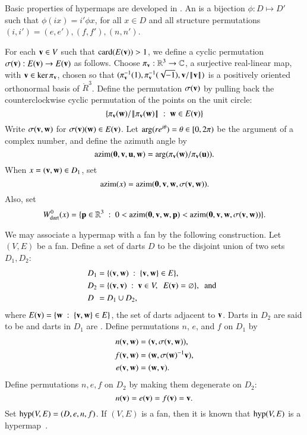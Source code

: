 \documentclass{llncs}
\def\op#1{{\hbox{#1}}}
\begin{document}

Basic properties of hypermaps are developed in \cite[Ch.~4]{DSP}.  An
 is a bijection $\phi:D\mapsto D'$
such that $\phi(i x) = i'\phi x$, for all $x\in D$ and all structure
permutations $(i,i')=(e,e'),(f,f'),(n,n')$.


For each ${\mathbf v}\in V$ such that $\card(E(\v))>1$, we define a cyclic
permutation $\sigma({\mathbf v}):E({\mathbf v})\to E({\mathbf v})$ as follows.  Choose
$\pi_{\mathbf v}:\mathbb{R}^3\to\mathbb{C}$, a surjective real-linear  map, with
$\v\in \op{ker}\,\pi_\v$, chosen so that
$(\pi^{-1}_{\mathbf v}(1),\pi^{-1}_{\mathbf v}(\sqrt{-1}),{\mathbf v}/{\hbox{\ensuremath{\hspace{0.1em}|\hspace{-0.1em}|\hspace{0.1em}}}{\mathbf v}\hbox{\ensuremath{\hspace{0.1em}|\hspace{-0.1em}|\hspace{0.1em}}}})$ is a
positively oriented orthonormal basis of $\ring{R}^3$.  Define the
permutation $\sigma({\mathbf v})$ by pulling back the counterclockwise cyclic
permutation of the points on the unit circle:
\[
\{\pi_{\mathbf v}({\mathbf w})/{\hbox{\ensuremath{\hspace{0.1em}|\hspace{-0.1em}|\hspace{0.1em}}}\pi_{\mathbf v}({\mathbf w})\hbox{\ensuremath{\hspace{0.1em}|\hspace{-0.1em}|\hspace{0.1em}}}} \ :\  {\mathbf w}\in E({\mathbf v})\}
\]
Write $\sigma({\mathbf v},{\mathbf w})$ for $\sigma({\mathbf v})({\mathbf w})\in E({\mathbf v})$.  
Let $\op{arg}(r e^{i\theta}) =\theta\in\leftclosed0,2\pi\rightopen$ 
be the argument of a complex number, and define the azimuth angle by
\[
\op{azim}(\orz,\v,\u,\w) = \op{arg}(\pi_\v(\w)/\pi_\v(\u)).
\]
When $x=({\mathbf v},{\mathbf w})\in D_1$, set 
\[
 \op{azim}(x) = \op{azim}(\orz,\v,\w,\sigma(\v,\w)).
\]
Also, set
\[
 \Wdarto(x) = \{\p\in\ring{R}^3 \mid 0 < 
 \azim(\orz,\v,\w,\p) < \azim(\orz,\v,\w,\sigma(\v,\w)) \}.
\]

We may associate a hypermap with a fan by the following
construction.  Let $(V,E)$ be a fan.  Define a set of darts $D$ to be
the disjoint union of two sets $D_1,D_2$:
\begin{align*}
D_1 &= \{({\mathbf v},{\mathbf w})\ :\  \{{\mathbf v},{\mathbf w}\}\in E\},\\
D_2 &= \{({\mathbf v},{\mathbf v}) \ :\  {\mathbf v}\in V,\ \ E({\mathbf v}) = \varnothing\},\text{ \ and \ } \\
D\phantom{_2}   &= D_1\cup D_2,
\end{align*}
where $E({\mathbf v})=\{{\mathbf w} \ :\  \{{\mathbf v},{\mathbf w}\}\in E\}$, the set of darts adjacent to ${\mathbf v}$.
Darts in $D_2$ are said to be  and darts in
$D_1$ are .
%
Define permutations $n$, $e$, and $f$ on $D_1$ by
\begin{align*}n({\mathbf v},{\mathbf w}) &= ({\mathbf v},\sigma({\mathbf v},{\mathbf w})),\\
f ({\mathbf v},{\mathbf w}) &= ({\mathbf w},\sigma({\mathbf w})^{-1} {\mathbf v}),\\
e ({\mathbf v},{\mathbf w}) &= ({\mathbf w},{\mathbf v}).
\end{align*}
Define permutations $n,e,f$ on $D_2$ by making them degenerate on $D_2$:
\[ 
n ({\mathbf v}) = e({\mathbf v}) = f({\mathbf v}) = {\mathbf v}.
\] 
Set %
$\op{hyp}(V,E)=(D,e,n,f)$. 
If $(V,E)$ is a fan, 
then it is known that $\op{hyp}(V,E)$ is a hypermap~\cite{DSP}.
\end{document}
